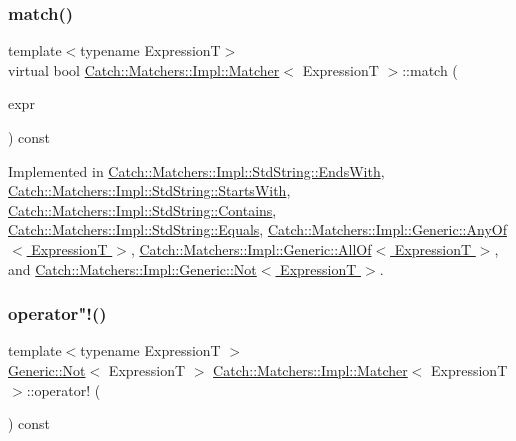 \subsubsection{\texorpdfstring{match()}{match()}}
{\footnotesize\ttfamily template$<$typename ExpressionT$>$ \\
virtual bool \hyperlink{struct_catch_1_1_matchers_1_1_impl_1_1_matcher}{Catch\+::\+Matchers\+::\+Impl\+::\+Matcher}$<$ ExpressionT $>$\+::match (\begin{DoxyParamCaption}\item[{ExpressionT const \&}]{expr }\end{DoxyParamCaption}) const\hspace{0.3cm}{\ttfamily [pure virtual]}}



Implemented in \hyperlink{struct_catch_1_1_matchers_1_1_impl_1_1_std_string_1_1_ends_with_aff66fb5af2d4f6161627cb20899b2c1b}{Catch\+::\+Matchers\+::\+Impl\+::\+Std\+String\+::\+Ends\+With}, \hyperlink{struct_catch_1_1_matchers_1_1_impl_1_1_std_string_1_1_starts_with_ab8f8d15e06d7ec13fee7d9ec4075dafa}{Catch\+::\+Matchers\+::\+Impl\+::\+Std\+String\+::\+Starts\+With}, \hyperlink{struct_catch_1_1_matchers_1_1_impl_1_1_std_string_1_1_contains_a2248f3d0d1eb5cf5a1059c183b811a7c}{Catch\+::\+Matchers\+::\+Impl\+::\+Std\+String\+::\+Contains}, \hyperlink{struct_catch_1_1_matchers_1_1_impl_1_1_std_string_1_1_equals_abf0a94b4e66dbd586268d9983f867e68}{Catch\+::\+Matchers\+::\+Impl\+::\+Std\+String\+::\+Equals}, \hyperlink{class_catch_1_1_matchers_1_1_impl_1_1_generic_1_1_any_of_adebd5437cdb8e0d54e16e97fe26e7e85}{Catch\+::\+Matchers\+::\+Impl\+::\+Generic\+::\+Any\+Of$<$ Expression\+T $>$}, \hyperlink{class_catch_1_1_matchers_1_1_impl_1_1_generic_1_1_all_of_a95231b6a455e1a646d0b54bce55138be}{Catch\+::\+Matchers\+::\+Impl\+::\+Generic\+::\+All\+Of$<$ Expression\+T $>$}, and \hyperlink{class_catch_1_1_matchers_1_1_impl_1_1_generic_1_1_not_a18c49fc6fb73a42d54650dafc18c7db1}{Catch\+::\+Matchers\+::\+Impl\+::\+Generic\+::\+Not$<$ Expression\+T $>$}.

\hypertarget{struct_catch_1_1_matchers_1_1_impl_1_1_matcher_a7ecd56842090611c9dbfc325b42fa942}{}\label{struct_catch_1_1_matchers_1_1_impl_1_1_matcher_a7ecd56842090611c9dbfc325b42fa942} 
\subsubsection{\texorpdfstring{operator"!()}{operator!()}}
{\footnotesize\ttfamily template$<$typename ExpressionT $>$ \\
\hyperlink{class_catch_1_1_matchers_1_1_impl_1_1_generic_1_1_not}{Generic\+::\+Not}$<$ ExpressionT $>$ \hyperlink{struct_catch_1_1_matchers_1_1_impl_1_1_matcher}{Catch\+::\+Matchers\+::\+Impl\+::\+Matcher}$<$ ExpressionT $>$\+::operator! (\begin{DoxyParamCaption}{ }\end{DoxyParamCaption}) const}




